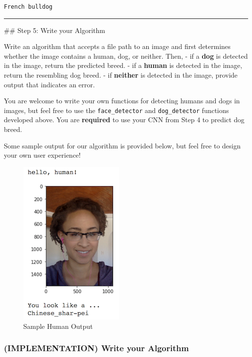 \documentclass[11pt]{article}
\makeatletter
\def\maxwidth{\ifdim\Gin@nat@width>\linewidth\linewidth
    \else\Gin@nat@width\fi}
\let\Oldincludegraphics\includegraphics
\renewcommand{\includegraphics}[1]{\Oldincludegraphics[width=.8\maxwidth]{#1}}
\makeatother
\begin{document}
    \begin{Verbatim}[commandchars=\\\{\}]
French bulldog

    \end{Verbatim}

    \begin{center}\rule{0.5\linewidth}{\linethickness}\end{center}

 \#\# Step 5: Write your Algorithm

Write an algorithm that accepts a file path to an image and first
determines whether the image contains a human, dog, or neither. Then, -
if a \textbf{dog} is detected in the image, return the predicted breed.
- if a \textbf{human} is detected in the image, return the resembling
dog breed. - if \textbf{neither} is detected in the image, provide
output that indicates an error.

You are welcome to write your own functions for detecting humans and
dogs in images, but feel free to use the \texttt{face\_detector} and
\texttt{dog\_detector} functions developed above. You are
\textbf{required} to use your CNN from Step 4 to predict dog breed.

Some sample output for our algorithm is provided below, but feel free to
design your own user experience!

\begin{figure}
\centering
\includegraphics{images/sample_human_output.png}
\caption{Sample Human Output}
\end{figure}

\hypertarget{implementation-write-your-algorithm}{%
\subsubsection{(IMPLEMENTATION) Write your
Algorithm}\label{implementation-write-your-algorithm}}
\end{document}
